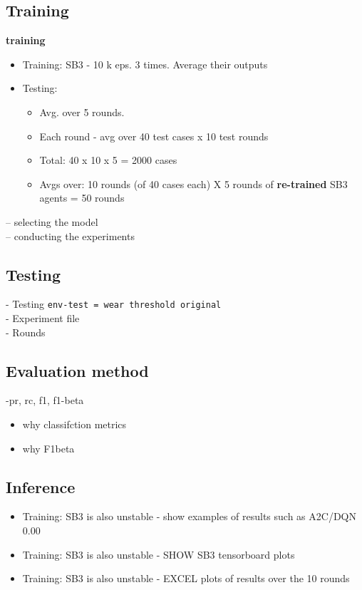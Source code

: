 \documentclass[a4paper, 12pt]{article}
\begin{document}
\subsection{Training}
 \textbf{training}
 \begin{itemize}
 	\item Training: SB3 - 10 k eps. 3 times. Average their outputs
 	\item Testing: 
 	\begin{itemize}
 		\item Avg. over 5 rounds.
 		\item Each round - avg over 40 test cases x 10 test rounds
 		\item Total: 40 x 10 x 5 = 2000 cases
 		\item Avgs over: 10 rounds (of 40 cases each) X 5 rounds of \textbf{re-trained} SB3 agents = 50 rounds 
 	\end{itemize}
 \end{itemize}
 -- selecting the model\\
 -- conducting the experiments\\
\subsection{Testing}
- Testing \texttt{env-test = wear threshold original}	\\
- Experiment file\\
- Rounds\\

\subsection{Evaluation method}
-pr, rc, f1, f1-beta

\begin{itemize}
	\item why classifction metrics
	\item why F1beta	
\end{itemize}


\subsection{Inference}
\begin{itemize}
	\item Training: SB3 is also unstable - show examples of results such as A2C/DQN 0.00 
	\item Training: SB3 is also unstable - SHOW SB3 tensorboard plots
	\item Training: SB3 is also unstable - EXCEL plots of results over the 10 rounds 	
\end{itemize}
\end{document}
